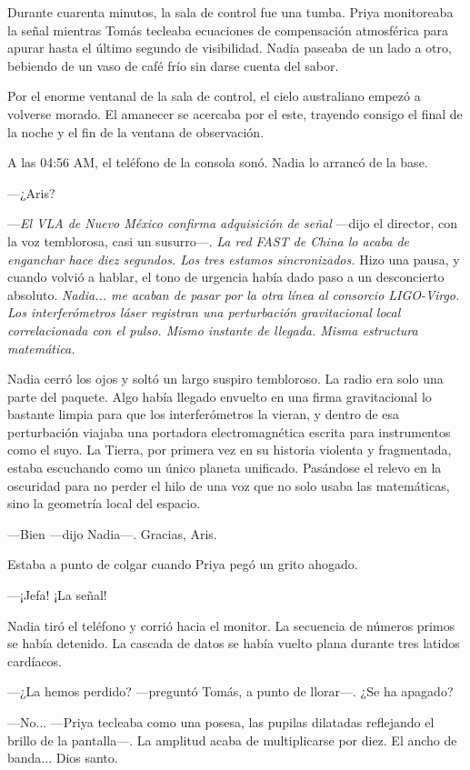 \documentclass[11pt,a5paper,twoside]{book}
\begin{document}
Durante cuarenta minutos, la sala de control fue una tumba. Priya monitoreaba la señal mientras Tomás tecleaba ecuaciones de compensación atmosférica para apurar hasta el último segundo de visibilidad. Nadia paseaba de un lado a otro, bebiendo de un vaso de café frío sin darse cuenta del sabor.

Por el enorme ventanal de la sala de control, el cielo australiano empezó a volverse morado. El amanecer se acercaba por el este, trayendo consigo el final de la noche y el fin de la ventana de observación.

A las 04:56 AM, el teléfono de la consola sonó. Nadia lo arrancó de la base.

—¿Aris?

—\textit{El VLA de Nuevo México confirma adquisición de señal} —dijo el director, con la voz temblorosa, casi un susurro—. \textit{La red FAST de China lo acaba de enganchar hace diez segundos. Los tres estamos sincronizados.} Hizo una pausa, y cuando volvió a hablar, el tono de urgencia había dado paso a un desconcierto absoluto. \textit{Nadia... me acaban de pasar por la otra línea al consorcio LIGO-Virgo. Los interferómetros láser registran una perturbación gravitacional local correlacionada con el pulso. Mismo instante de llegada. Misma estructura matemática.}

Nadia cerró los ojos y soltó un largo suspiro tembloroso. La radio era solo una parte del paquete. Algo había llegado envuelto en una firma gravitacional lo bastante limpia para que los interferómetros la vieran, y dentro de esa perturbación viajaba una portadora electromagnética escrita para instrumentos como el suyo. La Tierra, por primera vez en su historia violenta y fragmentada, estaba escuchando como un único planeta unificado. Pasándose el relevo en la oscuridad para no perder el hilo de una voz que no solo usaba las matemáticas, sino la geometría local del espacio.

—Bien —dijo Nadia—. Gracias, Aris.

Estaba a punto de colgar cuando Priya pegó un grito ahogado.

—¡Jefa! ¡La señal!

Nadia tiró el teléfono y corrió hacia el monitor. La secuencia de números primos se había detenido. La cascada de datos se había vuelto plana durante tres latidos cardíacos.

—¿La hemos perdido? —preguntó Tomás, a punto de llorar—. ¿Se ha apagado?

—No... —Priya tecleaba como una posesa, las pupilas dilatadas reflejando el brillo de la pantalla—. La amplitud acaba de multiplicarse por diez. El ancho de banda... Dios santo.
\end{document}
